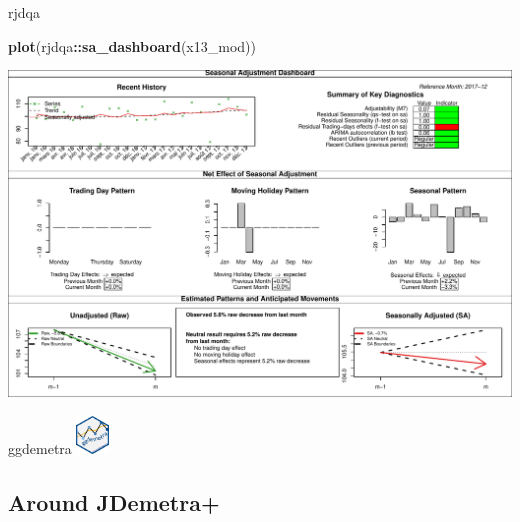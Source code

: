 \documentclass[10pt,xcolor=table,color={dvipsnames,usenames},ignorenonframetext,usepdftitle=false,french]{beamer}
\newenvironment{Shaded}{\begin{snugshade}}{\end{snugshade}}
\newcommand{\KeywordTok}[1]{\textcolor[rgb]{0.13,0.29,0.53}{\textbf{#1}}}
\newcommand{\NormalTok}[1]{#1}
\newcommand{\OperatorTok}[1]{\textcolor[rgb]{0.81,0.36,0.00}{\textbf{#1}}}
\begin{document}
\begin{frame}[fragile]{rjdqa}
\protect\hypertarget{rjdqa}{}

\footnotesize

\begin{Shaded}
\begin{Highlighting}[]
\KeywordTok{plot}\NormalTok{(rjdqa}\OperatorTok{::}\KeywordTok{sa_dashboard}\NormalTok{(x13_mod))}
\end{Highlighting}
\end{Shaded}

\includegraphics{img/markdown-unnamed-chunk-16-1.pdf}

\end{frame}

\begin{frame}{ggdemetra
\includegraphics[height=1cm]{img/ggdemetra_logo.png}}
\protect\hypertarget{ggdemetra}{}


\end{frame}

\hypertarget{around-jdemetra}{%
\subsection{Around JDemetra+}\label{around-jdemetra}}
\end{document}
